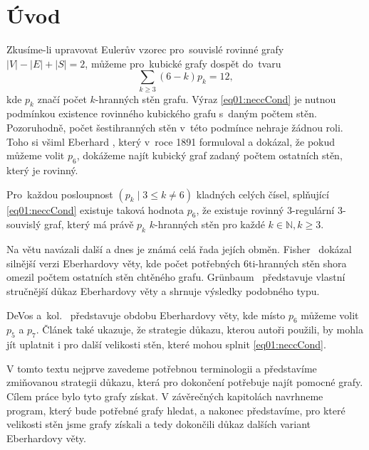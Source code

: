 \chapter*{Úvod}

Zkusíme-li upravovat Eulerův vzorec pro~souvislé rovinné grafy
$|V|-|E|+|S|=2$, můžeme pro~kubické grafy dospět do~tvaru 
\begin{equation}\label{eq01:neccCond}
\sum_{k \geq 3}{(6-k)p_k}=12,
\end{equation}
kde $p_k$ značí počet $k$-hranných stěn grafu. Výraz \eqref{eq01:neccCond} je nutnou podmínkou existence rovinného kubického grafu s~daným počtem stěn. Pozoruhodně, počet šestihranných stěn v~této podmínce nehraje žádnou roli. Toho si všiml Eberhard \cite{Eberhard91}, který v~roce 1891 formuloval a dokázal, že pokud můžeme volit $p_6$, dokážeme najít kubický graf zadaný počtem ostatních stěn, který je rovinný.

\begin{veta}\label{veta:Eberhard}
Pro~každou posloupnost $(p_k \mid 3 \leq k \neq 6)$ kladných celých čísel, splňující \eqref{eq01:neccCond} existuje taková hodnota $p_6$, že existuje rovinný 3-regulární 3-souvislý graf, který má právě $p_k$ $k$-hranných stěn pro každé $k \in \mathbb{N}, k \geq 3 $.
\end{veta}

Na větu navázali další a dnes je známá celá řada jejích obměn. Fisher~\cite{Fisher74} dokázal silnější verzi Eberhardovy věty, kde počet potřebných 6ti-hranných stěn shora omezil počtem ostatních stěn chtěného grafu. Grünbaum~\cite{Grunbaum} představuje vlastní stručnější důkaz Eberhardovy věty a shrnuje výsledky podobného typu. 

DeVos a~kol.~\cite{Samal09} představuje obdobu Eberhardovy věty, kde místo $p_6$ můžeme volit $p_5$ a $p_7$. Článek také ukazuje, že strategie důkazu, kterou autoři použili, by mohla jít uplatnit i pro další velikosti stěn, které mohou splnit \eqref{eq01:neccCond}. 

V tomto textu nejprve zavedeme potřebnou terminologii a představíme zmiňovanou strategii důkazu, která pro dokončení potřebuje najít pomocné grafy. Cílem práce bylo tyto grafy získat. V závěrečných kapitolách navrhneme program, který bude potřebné grafy hledat, a nakonec představíme, pro které velikosti stěn jsme grafy získali a tedy dokončili důkaz dalších variant Eberhardovy věty.

